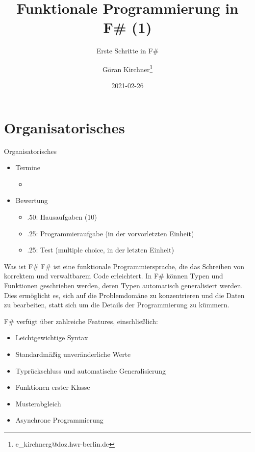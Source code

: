 \documentclass[t]{beamer}
\author{Göran Kirchner\thanks{e\_kirchnerg@doz.hwr-berlin.de}}
\date{2021-02-26}
\title{Funktionale Programmierung in F\# (1)}
\subtitle{Erste Schritte in F\#}
\begin{document}
\maketitle

\section{Organisatorisches }
\label{sec:org0cdd120}

\begin{frame}[label={sec:org7f83768}]{Organisatorisches}
\begin{itemize}
\item Termine
\begin{itemize}
\item\relax [26.02, 12.03, 26.03, 09.04, 23.04]
\end{itemize}
\item Bewertung
\begin{itemize}
\item .50: Hausaufgaben (10)
\item .25: Programmieraufgabe (in der vorvorletzten Einheit)
\item .25: Test (multiple choice, in der letzten Einheit)
\end{itemize}
\end{itemize}
\end{frame}

\begin{frame}[label={sec:org5b7728e}]{Was ist F\#}
F\# ist eine funktionale Programmiersprache, die das Schreiben von korrektem und verwaltbarem Code erleichtert.
In F\# können Typen und Funktionen geschrieben werden, deren Typen automatisch generalisiert werden. Dies ermöglicht es, sich auf die Problemdomäne zu konzentrieren und die Daten zu bearbeiten, statt sich um die Details der Programmierung zu kümmern.

F\# verfügt über zahlreiche Features, einschließlich:
\begin{itemize}
\item Leichtgewichtige Syntax
\item Standardmäßig unveränderliche Werte
\item Typrückschluss und automatische Generalisierung
\item Funktionen erster Klasse
\item Musterabgleich
\item Asynchrone Programmierung
\end{itemize}
\end{frame}
\end{document}
